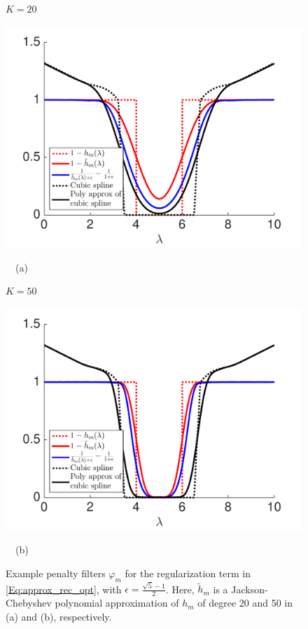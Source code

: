 \documentclass[journal, 10pt]{IEEEtran}
\begin{document}
\begin{figure}[tb]
\begin{minipage}[m]{0.49\linewidth}
\centerline{\small{$K=20$}}
\centerline{\includegraphics[width=1.1\linewidth]{fig_reg_filters_20}}
\centerline{~~\small{(a)}}
\end{minipage}
\begin{minipage}[m]{0.49\linewidth}
\centerline{\small{$K=50$}}
\centerline{\includegraphics[width=1.1\linewidth]{fig_reg_filters_50}}
\centerline{~~\small{(b)}}
\end{minipage} 
\caption{Example penalty filters $\varphi_m$ for the regularization term in \eqref{Eq:approx_rec_opt}, with $\epsilon=\frac{\sqrt{5}-1}{2}$. Here, $\tilde{h}_m$ is a Jackson-Chebyshev polynomial approximation of $h_m$ of degree 20 and 50 in (a) and (b), respectively. \vspace{-.15in} }\label{Fig:penalty}
\end{figure}
\end{document}
